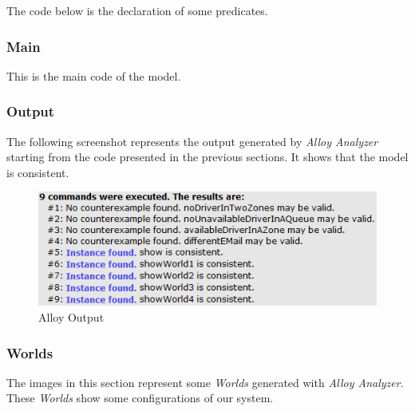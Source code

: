 \documentclass[a4paper]{article}
\begin{document}
The code below is the declaration of some predicates.

\nopagebreak
\begin{minipage}[c]{\codeWidth}

\end{minipage}

\subsubsection{Main}

This is the main code of the model.

\nopagebreak
\begin{minipage}[c]{\codeWidth}

\end{minipage}

\subsubsection{Output}

The following screenshot represents the output generated by \emph{Alloy Analyzer} starting from the code presented in the previous sections. It shows that the model is consistent.

\nopagebreak
\begin{figure}[H]
\includegraphics[width=.7\textwidth]{Alloy-Output}
\centering
\caption{Alloy Output}
\label{fig:alloyoutput}
\end{figure}

\subsubsection{Worlds}

The images in this section represent some \emph{Worlds} generated with \emph{Alloy Analyzer}. These \emph{Worlds} show some configurations of our system.

\newlength{\worldsWidth}
\setlength{\worldsWidth}{.9\textwidth}
\end{document}
